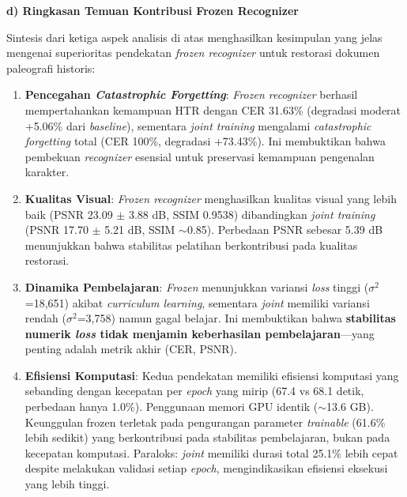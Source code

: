 \documentclass[12pt,a4paper]{article}
\begin{document}
\vspace{0.5em}

\textbf{d) Ringkasan Temuan Kontribusi Frozen Recognizer}

Sintesis dari ketiga aspek analisis di atas menghasilkan kesimpulan yang jelas mengenai superioritas pendekatan \textit{frozen recognizer} untuk restorasi dokumen paleografi historis:

\begin{enumerate}[label=\arabic*., leftmargin=0.5cm]
    \item \textbf{Pencegahan \textit{Catastrophic Forgetting}}: \textit{Frozen recognizer} berhasil mempertahankan kemampuan HTR dengan CER 31.63\% (degradasi moderat +5.06\% dari \textit{baseline}), sementara \textit{joint training} mengalami \textit{catastrophic forgetting} total (CER 100\%, degradasi +73.43\%). Ini membuktikan bahwa pembekuan \textit{recognizer} esensial untuk preservasi kemampuan pengenalan karakter.
    
    \item \textbf{Kualitas Visual}: \textit{Frozen recognizer} menghasilkan kualitas visual yang lebih baik (PSNR 23.09 $\pm$ 3.88 dB, SSIM 0.9538) dibandingkan \textit{joint training} (PSNR 17.70 $\pm$ 5.21 dB, SSIM $\sim$0.85). Perbedaan PSNR sebesar 5.39 dB menunjukkan bahwa stabilitas pelatihan berkontribusi pada kualitas restorasi.
    
    \item \textbf{Dinamika Pembelajaran}: \textit{Frozen} menunjukkan variansi \textit{loss} tinggi ($\sigma^2$=18,651) akibat \textit{curriculum learning}, sementara \textit{joint} memiliki variansi rendah ($\sigma^2$=3,758) namun gagal belajar. Ini membuktikan bahwa \textbf{stabilitas numerik \textit{loss} tidak menjamin keberhasilan pembelajaran}—yang penting adalah metrik akhir (CER, PSNR).
    
    \item \textbf{Efisiensi Komputasi}: Kedua pendekatan memiliki efisiensi komputasi yang sebanding dengan kecepatan per \textit{epoch} yang mirip (67.4 vs 68.1 detik, perbedaan hanya 1.0\%). Penggunaan memori GPU identik ($\sim$13.6 GB). Keunggulan frozen terletak pada pengurangan parameter \textit{trainable} (61.6\% lebih sedikit) yang berkontribusi pada stabilitas pembelajaran, bukan pada kecepatan komputasi. Paraloks: \textit{joint} memiliki durasi total 25.1\% lebih cepat despite melakukan validasi setiap \textit{epoch}, mengindikasikan efisiensi eksekusi yang lebih tinggi.
\end{enumerate}
\end{document}
